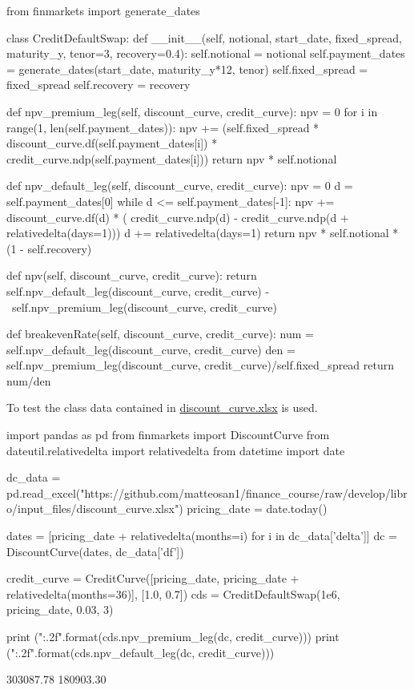 \begin{ipython}
from finmarkets import generate_dates

class CreditDefaultSwap:
    def __init__(self, notional, start_date, fixed_spread,
                 maturity_y, tenor=3, recovery=0.4):
        self.notional = notional
        self.payment_dates = generate_dates(start_date,
                                            maturity_y*12, tenor)
        self.fixed_spread = fixed_spread
        self.recovery = recovery

    def npv_premium_leg(self, discount_curve, credit_curve):
        npv = 0
        for i in range(1, len(self.payment_dates)):
            npv += (self.fixed_spread *
                    discount_curve.df(self.payment_dates[i]) *
                    credit_curve.ndp(self.payment_dates[i]))
        return npv * self.notional

    def npv_default_leg(self, discount_curve, credit_curve):
        npv = 0
        d = self.payment_dates[0]
        while d <= self.payment_dates[-1]:
            npv += discount_curve.df(d) * (
                   credit_curve.ndp(d) -
                   credit_curve.ndp(d + relativedelta(days=1)))
            d += relativedelta(days=1)
        return npv * self.notional * (1 - self.recovery)

    def npv(self, discount_curve, credit_curve):
        return self.npv_default_leg(discount_curve, credit_curve) - \
               self.npv_premium_leg(discount_curve, credit_curve)

    def breakevenRate(self, discount_curve, credit_curve):
        num = self.npv_default_leg(discount_curve, credit_curve)
        den = self.npv_premium_leg(discount_curve, credit_curve)/self.fixed_spread
        return num/den
\end{ipython}

To test the class data contained in \href{https://github.com/matteosan1/finance_course/raw/develop/libro/input_files/discount_curve.xlsx}{discount\_curve.xlsx} is used.

\begin{ipython}
import pandas as pd
from finmarkets import DiscountCurve
from dateutil.relativedelta import relativedelta
from datetime import date

dc_data = pd.read_excel("https://github.com/matteosan1/finance_course/raw/develop/libro/input_files/discount_curve.xlsx")
pricing_date = date.today() 

dates = [pricing_date + relativedelta(months=i) for i in dc_data['delta']]
dc = DiscountCurve(dates, dc_data['df'])

credit_curve = CreditCurve([pricing_date,
                            pricing_date + relativedelta(months=36)],
                            [1.0, 0.7])
cds = CreditDefaultSwap(1e6, pricing_date, 0.03, 3)

print ("{:.2f}".format(cds.npv_premium_leg(dc, credit_curve)))
print ("{:.2f}".format(cds.npv_default_leg(dc, credit_curve)))
\end{ipython}
\begin{ioutput}
303087.78
180903.30
\end{ioutput}

